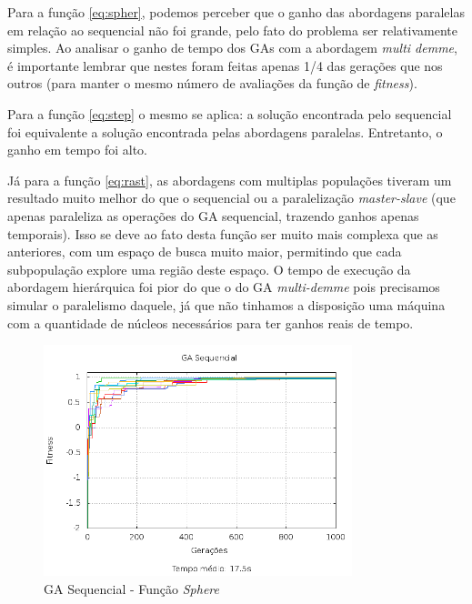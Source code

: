 \documentclass[12pt]{article}
\begin{document}
Para a função \ref{eq:spher}, podemos perceber que o ganho das abordagens paralelas em relação ao sequencial não foi grande, pelo fato do problema ser relativamente simples. Ao analisar o ganho de tempo dos GAs com a abordagem \emph{multi demme}, é importante lembrar que nestes foram feitas apenas 1/4 das gerações que nos outros (para manter o mesmo número de avaliações da função de \emph{fitness}).

Para a função \ref{eq:step} o mesmo se aplica: a solução encontrada pelo sequencial foi equivalente a solução encontrada pelas abordagens paralelas. Entretanto, o ganho em tempo foi alto.

Já para a função \ref{eq:rast}, as abordagens com multiplas populações tiveram um resultado muito melhor do que o sequencial ou a paralelização \emph{master-slave} (que apenas paraleliza as operações do GA sequencial, trazendo ganhos apenas temporais). Isso se deve ao fato desta função ser muito mais complexa que as anteriores, com um espaço de busca muito maior, permitindo que cada subpopulação explore uma região deste espaço. O tempo de execução da abordagem hierárquica foi pior do que o do GA \emph{multi-demme} pois precisamos simular o paralelismo daquele, já que não tinhamos a disposição uma máquina com a quantidade de núcleos necessários para ter ganhos reais de tempo.

\begin{figure}[hp]
  \centering
  \includegraphics[width=0.8\textwidth]{seq_f1.png}
  \caption{GA Sequencial - Função \emph{Sphere}}
\end{figure}
\end{document}
